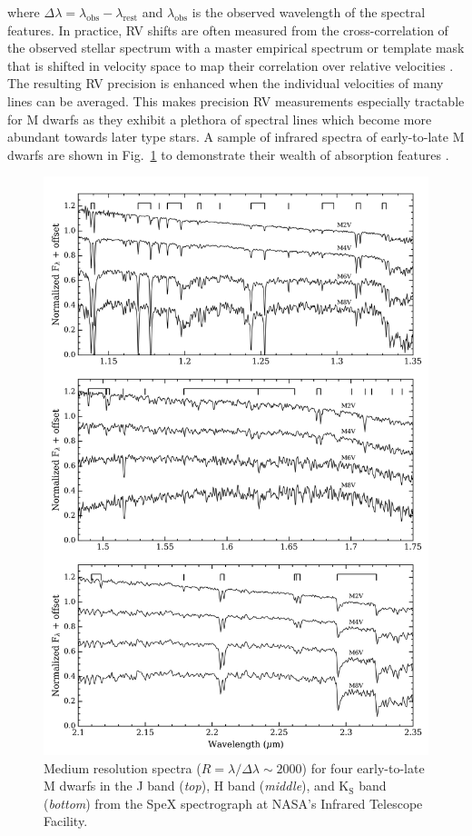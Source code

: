 \noindent where $\Delta \lambda = \lambda_{\text{obs}}-\lambda_{\text{rest}}$ and
$\lambda_{\text{obs}}$ is the observed wavelength of the spectral features. 
In practice, RV shifts are often measured from the cross-correlation of 
the observed stellar spectrum with a master empirical spectrum or template mask
that is shifted in velocity space to map their correlation over relative velocities
\citep{astudillodefru15}. The resulting RV precision is enhanced when the individual velocities
of many lines can be averaged. This makes precision RV measurements especially tractable for M
dwarfs as they exhibit a plethora of 
spectral lines which become more abundant towards later type stars.
A sample of infrared spectra of early-to-late M dwarfs 
are shown in Fig.~\ref{fig:spectra} to demonstrate their wealth of absorption features
\citep{rayner09}.  \\

\begin{figure}
\centering
\includegraphics[width=0.8\hsize]{figures/Mdwarf_spectra.png}
\caption[Near-IR spectra of early-to-late M dwarfs.]
        {Medium resolution spectra ($R=\lambda / \Delta \lambda \sim 2000$)
          for four early-to-late M dwarfs in the J band (\emph{top}),
  H band (\emph{middle}), and K$_{\text{S}}$ band (\emph{bottom}) from the SpeX spectrograph
  at NASA's Infrared Telescope Facility. \label{fig:spectra}}
\end{figure}

